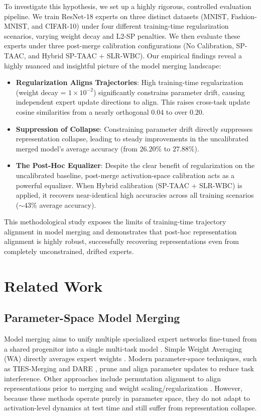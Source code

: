 \documentclass{article}
\theoremstyle{plain}
\theoremstyle{definition}
\theoremstyle{remark}
\begin{document}
To investigate this hypothesis, we set up a highly rigorous, controlled evaluation pipeline. We train ResNet-18 experts on three distinct datasets (MNIST, Fashion-MNIST, and CIFAR-10) under four different training-time regularization scenarios, varying weight decay and L2-SP penalties. We then evaluate these experts under three post-merge calibration configurations (No Calibration, SP-TAAC, and Hybrid SP-TAAC + SLR-WBC). Our empirical findings reveal a highly nuanced and insightful picture of the model merging landscape:

\begin{itemize}\itemsep=0pt \parsep=0pt
    \item \textbf{Regularization Aligns Trajectories}: High training-time regularization (weight decay = $1\times 10^{-2}$) significantly constrains parameter drift, causing independent expert update directions to align. This raises cross-task update cosine similarities from a nearly orthogonal $0.04$ to over $0.20$.
    \item \textbf{Suppression of Collapse}: Constraining parameter drift directly suppresses representation collapse, leading to steady improvements in the uncalibrated merged model's average accuracy (from $26.20\%$ to $27.88\%$).
    \item \textbf{The Post-Hoc Equalizer}: Despite the clear benefit of regularization on the uncalibrated baseline, post-merge activation-space calibration acts as a powerful equalizer. When Hybrid calibration (SP-TAAC + SLR-WBC) is applied, it recovers near-identical high accuracies across all training scenarios ($\sim 43\%$ average accuracy).
\end{itemize}

This methodological study exposes the limits of training-time trajectory alignment in model merging and demonstrates that post-hoc representation alignment is highly robust, successfully recovering representations even from completely unconstrained, drifted experts.

\section{Related Work}

\subsection{Parameter-Space Model Merging}
Model merging aims to unify multiple specialized expert networks fine-tuned from a shared progenitor into a single multi-task model \cite{Choshen2022, Tang2023}. Simple Weight Averaging (WA) directly averages expert weights \cite{Wortsman2022}. Modern parameter-space techniques, such as TIES-Merging \cite{Yadav2023} and DARE \cite{Yu2023}, prune and align parameter updates to reduce task interference. Other approaches include permutation alignment to align representations prior to merging \cite{Ainsworth2023, Stoica2023} and weight scaling/regularization \cite{Jin2023a, Matena2022}. However, because these methods operate purely in parameter space, they do not adapt to activation-level dynamics at test time and still suffer from representation collapse.
\end{document}
